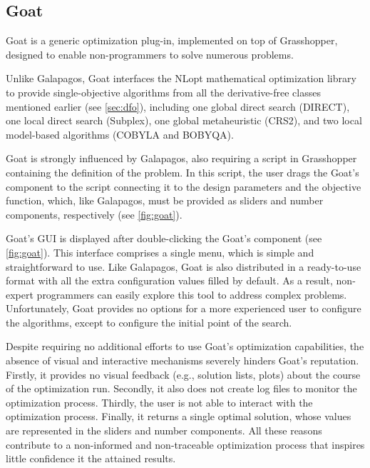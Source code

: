 	\subsection{Goat}
	Goat \cite{GOAT} is a generic optimization plug-in, implemented on top of Grasshopper, designed to enable non-programmers to solve numerous problems.
	
	Unlike Galapagos, Goat interfaces the NLopt mathematical optimization library~\cite{NLOPT} to provide single-objective algorithms from all the derivative-free classes mentioned earlier (see \cref{sec:dfo}), including one global direct search (DIRECT), one local direct search (Subplex), one global metaheuristic (CRS2), and two local model-based algorithms (COBYLA and BOBYQA). 
	
	Goat is strongly influenced by Galapagos, also requiring a script in Grasshopper containing the definition of the problem. In this script, the user drags the Goat's component to the script connecting it to the design parameters and the objective function, which, like Galapagos, must be provided as sliders and number components, respectively (see \cref{fig:goat}).
	
	Goat's \ac{GUI} is displayed after double-clicking the Goat's component (see \cref{fig:goat}). This interface comprises a single menu, which is simple and straightforward to use. Like Galapagos, Goat is also distributed in a ready-to-use format with all the extra configuration values filled by default. As a result, non-expert programmers can easily explore this tool to address complex problems. Unfortunately, Goat provides no options for a more experienced user to configure the algorithms, except to configure the initial point of the search.
	
	Despite requiring no additional efforts to use Goat's optimization capabilities, the absence of visual and interactive mechanisms severely hinders Goat's reputation. Firstly, it provides no visual feedback (e.g., solution lists, plots) about the course of the optimization run. Secondly, it also does not create log files to monitor the optimization process. Thirdly, the user is not able to interact with the optimization process. Finally, it returns a single optimal solution, whose values are represented in the sliders and number components. All these reasons contribute to a non-informed and non-traceable optimization process that inspires little confidence it the attained results. 
	
